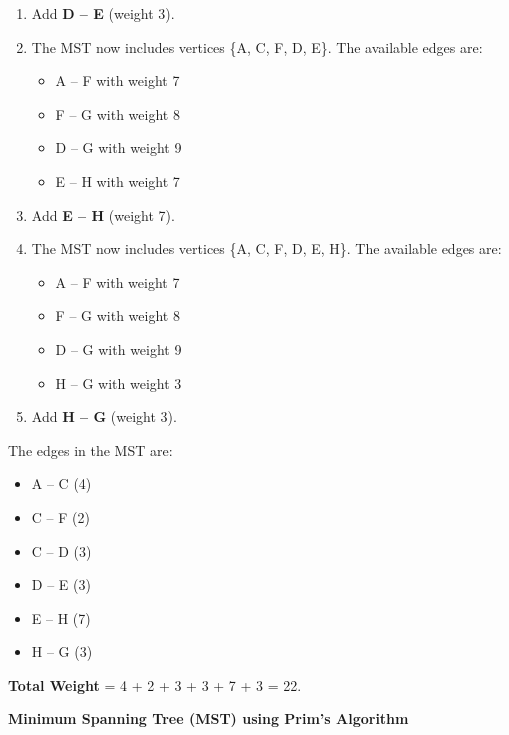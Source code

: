 \documentclass[12pt]{article}
\theoremstyle{plain}
\begin{document}
\begin{itemize}
\begin{enumerate}
        \item Add \textbf{D -- E} (weight 3).
        \item The MST now includes vertices \{A, C, F, D, E\}. The available edges are:
            \begin{itemize}
                \item A -- F with weight 7
                \item F -- G with weight 8
                \item D -- G with weight 9
                \item E -- H with weight 7
            \end{itemize}
        \item Add \textbf{E -- H} (weight 7).
        \item The MST now includes vertices \{A, C, F, D, E, H\}. The available edges are:
            \begin{itemize}
                \item A -- F with weight 7
                \item F -- G with weight 8
                \item D -- G with weight 9
                \item H -- G with weight 3
            \end{itemize}
        \item Add \textbf{H -- G} (weight 3).
    \end{enumerate}
    The edges in the MST are:
    \begin{itemize}
        \item A -- C (4)
        \item C -- F (2)
        \item C -- D (3)
        \item D -- E (3)
        \item E -- H (7)
        \item H -- G (3)
    \end{itemize}
    
    \noindent \textbf{Total Weight} = 4 + 2 + 3 + 3 + 7 + 3 = 22.

    \begin{center}
    \textbf{Minimum Spanning Tree (MST) using Prim's Algorithm}
    \end{center}
    
\end{itemize}
\end{document}
